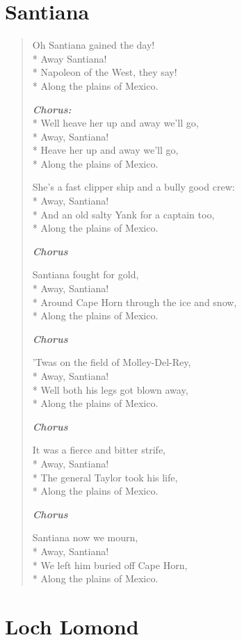 \documentclass[9pt,twoside]{extarticle}
\newenvironment{xverse}{
	\begin{verse}
	\fontsize{8.5}{10.5}\selectfont
	}
	{
	\end{verse}
	\penalty 0
}
\newcommand{\chorusdef}{\textbf{\emph{Chorus:}}\\*}
\newcommand{\chorusmark}[1][1]{%
\vspace{-0.5\stanzaskip}%
\textbf{\emph{Chorus \ifthenelse{\equal{#1}{1}}{}{$\times$ #1}}}%
\vspace{-0.5\stanzaskip}%
}
\begin{document}
\section{Santiana}
\begin{xverse}
Oh Santiana gained the day! \\*
Away Santiana! \\*
Napoleon of the West, they say! \\*
Along the plains of Mexico.

\chorusdef
Well heave her up and away we’ll go, \\*
Away, Santiana! \\*
Heave her up and away we’ll go, \\*
Along the plains of Mexico.

She’s a fast clipper ship and a bully good crew: \\*
Away, Santiana! \\*
And an old salty Yank for a captain too, \\*
Along the plains of Mexico.

\chorusmark

Santiana fought for gold, \\*
Away, Santiana! \\*
Around Cape Horn through the ice and snow, \\*
Along the plains of Mexico.

\chorusmark

’Twas on the field of Molley-Del-Rey, \\*
Away, Santiana! \\*
Well both his legs got blown away, \\*
Along the plains of Mexico.

\chorusmark

It was a fierce and bitter strife, \\*
Away, Santiana! \\*
The general Taylor took his life, \\*
Along the plains of Mexico.

\chorusmark

Santiana now we mourn, \\*
Away, Santiana! \\*
We left him buried off Cape Horn, \\*
Along the plains of Mexico.
\end{xverse}


\section{Loch Lomond}
\end{document}
